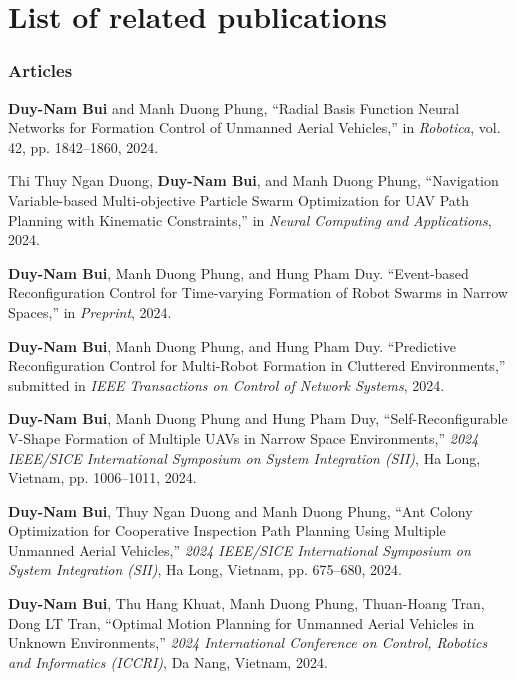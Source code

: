 \chapter*{List of related publications}

\subsection*{Articles}
\textbf{Duy-Nam Bui} and Manh Duong Phung, ``Radial Basis Function Neural Networks for Formation Control of Unmanned Aerial Vehicles,'' in \textit{Robotica}, vol. 42, pp. {1842--1860}, 2024.

Thi Thuy Ngan Duong, \textbf{Duy-Nam Bui}, and Manh Duong Phung, ``Navigation Variable-based Multi-objective Particle Swarm Optimization for UAV Path Planning with Kinematic Constraints,'' in \textit{Neural Computing and Applications}, 2024.

\textbf{Duy-Nam Bui}, Manh Duong Phung, and Hung Pham Duy. ``Event-based Reconfiguration Control for Time-varying Formation of Robot Swarms in Narrow Spaces,'' in \textit{Preprint}, 2024.

\textbf{Duy-Nam Bui}, Manh Duong Phung, and Hung Pham Duy. ``Predictive Reconfiguration Control for Multi-Robot Formation in Cluttered Environments,'' submitted in \textit{IEEE Transactions on Control of Network Systems}, 2024.

\textbf{Duy-Nam Bui}, Manh Duong Phung and Hung Pham Duy, ``Self-Reconfigurable V-Shape Formation of Multiple UAVs in Narrow Space Environments,'' \textit{2024 IEEE/SICE International Symposium on System Integration (SII)}, Ha Long, Vietnam, pp. 1006--1011, 2024.

\textbf{Duy-Nam Bui}, Thuy Ngan Duong and Manh Duong Phung, ``Ant Colony Optimization for Cooperative Inspection Path Planning Using Multiple Unmanned Aerial Vehicles,'' \textit{2024 IEEE/SICE International Symposium on System Integration (SII)}, Ha Long, Vietnam, pp. 675--680, 2024.

\textbf{Duy-Nam Bui}, Thu Hang Khuat, Manh Duong Phung, Thuan-Hoang Tran, Dong LT Tran, ``Optimal Motion Planning for Unmanned Aerial Vehicles in Unknown Environments,'' \textit{2024 International Conference on Control, Robotics and Informatics (ICCRI)}, Da Nang, Vietnam, 2024.


